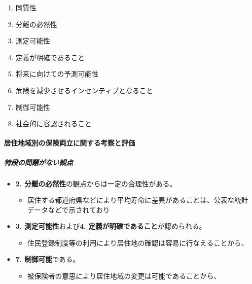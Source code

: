 \documentclass[
]{article}
\providecommand{\tightlist}{%
  \setlength{\itemsep}{0pt}\setlength{\parskip}{0pt}}
\begin{document}
\begin{enumerate}
\def\labelenumi{\arabic{enumi}.}
\tightlist
\item
  同質性
\item
  分離の必然性
\item
  測定可能性
\item
  定義が明確であること
\item
  将来に向けての予測可能性
\item
  危険を減少させるインセンティブとなること
\item
  制御可能性
\item
  社会的に容認されること
\end{enumerate}

\hypertarget{ux5c45ux4f4fux5730ux57dfux5225ux306eux4fddux967aux4e21ux7acbux306bux95a2ux3059ux308bux8003ux5bdfux3068ux8a55ux4fa1}{%
\paragraph{居住地域別の保険両立に関する考察と評価}\label{ux5c45ux4f4fux5730ux57dfux5225ux306eux4fddux967aux4e21ux7acbux306bux95a2ux3059ux308bux8003ux5bdfux3068ux8a55ux4fa1}}

\hypertarget{ux7279ux6bb5ux306eux554fux984cux304cux306aux3044ux89b3ux70b9}{%
\subparagraph{特段の問題がない観点}\label{ux7279ux6bb5ux306eux554fux984cux304cux306aux3044ux89b3ux70b9}}

\begin{itemize}
\tightlist
\item
  \textbf{2. 分離の必然性}の観点からは一定の合理性がある。

  \begin{itemize}
  \tightlist
  \item
    居住する都道府県などにより平均寿命に差異があることは、公表な統計データなどで示されており
  \end{itemize}
\item
  \textbf{3. 測定可能性}および\textbf{4.
  定義が明確であること}が認められる。

  \begin{itemize}
  \tightlist
  \item
    住民登録制度等の利用により居住地の確認は容易に行なえることから、
  \end{itemize}
\item
  \textbf{7. 制御可能}である。

  \begin{itemize}
  \tightlist
  \item
    被保険者の意思により居住地域の変更は可能であることから、
  \end{itemize}
\end{itemize}
\end{document}
